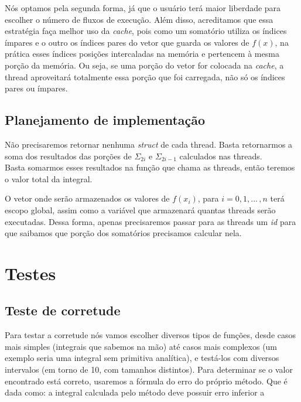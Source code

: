 \documentclass{article}
\begin{document}
Nós optamos pela segunda forma, já que o usuário terá
maior liberdade para escolher o número de fluxos de execução.
Além disso, acreditamos que essa estratégia
faça melhor uso da \emph{cache}, pois como um somatório utiliza
os índices ímpares e o outro os índices pares do vetor que guarda
os valores de $f(x)$, na prática esses índices posições intercaladas
na memória e pertencem à mesma porção da memória.
Ou seja, se uma porção do vetor for colocada na \emph{cache},
a thread aproveitará totalmente essa
porção que foi carregada, não só os índices pares ou ímpares.

\subsection{Planejamento de implementação}

Não precisaremos retornar nenhuma \emph{struct} de cada thread.
Basta retornarmos a soma dos resultados das porções de
$\Sigma_{2i}$ e $\Sigma_{2i-1}$ calculados nas threads.\\
Basta somarmos esses resultados na função que chama as
threads, então teremos o valor total da integral.

O vetor onde serão armazenados os valores de $f(x_i)$, para
$i = 0,1,...\,,n$ terá escopo global, assim como a variável
que armazenará quantas threads serão executadas. Dessa
forma, apenas precisaremos passar para as threads um 
\emph{id} para que saibamos que porção dos somatórios
precisamos calcular nela.

\section{Testes}

\subsection{Teste de corretude}
Para testar a corretude nós vamos escolher diversos tipos de funções, desde 
casos mais simples (integrais que sabemos na mão) até casos mais complexos 
(um exemplo seria uma integral sem primitiva analítica), e testá-los com
diversos intervalos (em torno de 10, com tamanhos distintos). Para determinar
se o valor encontrado está correto, usaremos a fórmula do erro do próprio método. Que é dada como: a integral calculada pelo
método deve possuir
erro inferior a
\end{document}
